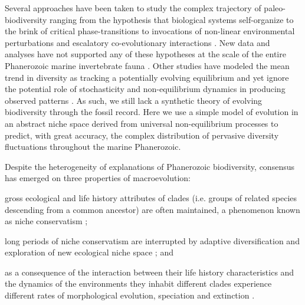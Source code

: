 \documentclass[11pt]{article}
\begin{document}
Several approaches have been taken to study the complex trajectory of
paleo-biodiversity ranging from the hypothesis that biological systems
self-organize to the brink of critical phase-transitions
\citep{bak1993, sole1997} to invocations of non-linear environmental
perturbations \citep{newman1995} and escalatory co-evolutionary
interactions \citep{vermeij1987}. New data and analyses have not
supported any of these hypotheses at the scale of the entire
Phanerozoic marine invertebrate fauna \citep{kirchner1998, madin2006,
  alroy08}. Other studies have modeled the mean trend in diversity as
tracking a potentially evolving equilibrium \citep{sepkoski1984,
  alroy08, alroy2010, rabosky2009ecolLett} and yet ignore the
potential role of stochasticity and non-equilibrium dynamics in
producing observed patterns \citep{erwin2012, liow2007,
  quental2013}. As such, we still lack a synthetic theory of evolving
biodiversity through the fossil record.
%
Here we use a simple model of evolution in an abstract niche space
derived from universal non-equilibrium processes to predict,
with great accuracy, the complex distribution of pervasive diversity
fluctuations throughout the marine Phanerozoic.

Despite the heterogeneity of explanations of Phanerozoic
biodiversity, consensus has emerged on three properties of
macroevolution:
\begin{inparaenum}
\item gross ecological and life history attributes of clades
  (i.e. groups of related species descending from a common ancestor)
  are often maintained, a phenomenon known as niche conservatism
  \citep{roy2009range, hopkins2014};
\item long periods of niche conservatism are interrupted by adaptive
  diversification and exploration of new ecological niche space
  \citep{eldredgeGould1972, newman1985adaptive, hopkins2014}; and
\item as a consequence of the interaction between their life history
  characteristics and the dynamics of the environments they inhabit
  \citep{vrba1983} different clades experience different rates of
  morphological evolution, speciation and extinction
  \citep{simpson1953, sepkoski1984, holman1989, gilinsky1994}.
\end{inparaenum}
\end{document}

